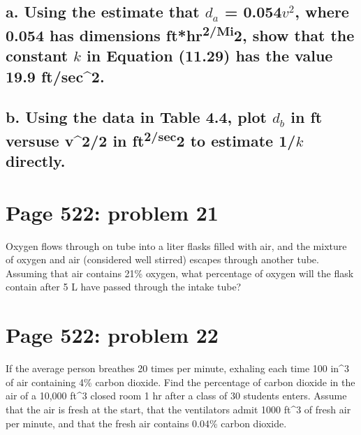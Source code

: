 \documentclass[]{article}
\begin{document}
\subsection{\texorpdfstring{a. Using the estimate that \(d_a\) =
0.054\(v^2\), where 0.054 has dimensions ft*hr\textsuperscript{2/Mi}2,
show that the constant \(k\) in Equation (11.29) has the value 19.9
ft/sec\^{}2.}{a. Using the estimate that d\_a = 0.054v\^{}2, where 0.054 has dimensions ft*hr2/Mi2, show that the constant k in Equation (11.29) has the value 19.9 ft/sec\^{}2.}}\label{a.-using-the-estimate-that-d_a-0.054v2-where-0.054-has-dimensions-fthr2mi2-show-that-the-constant-k-in-equation-11.29-has-the-value-19.9-ftsec2.}

\subsection{\texorpdfstring{b. Using the data in Table 4.4, plot \(d_b\)
in ft versuse v\^{}2/2 in ft\textsuperscript{2/sec}2 to estimate 1/\(k\)
directly.}{b. Using the data in Table 4.4, plot d\_b in ft versuse v\^{}2/2 in ft2/sec2 to estimate 1/k directly.}}\label{b.-using-the-data-in-table-4.4-plot-d_b-in-ft-versuse-v22-in-ft2sec2-to-estimate-1k-directly.}

\section{Page 522: problem 21}\label{page-522-problem-21}

Oxygen flows through on tube into a liter flasks filled with air, and
the mixture of oxygen and air (considered well stirred) escapes through
another tube. Assuming that air contains 21\% oxygen, what percentage of
oxygen will the flask contain after 5 L have passed through the intake
tube?

\section{Page 522: problem 22}\label{page-522-problem-22}

If the average person breathes 20 times per minute, exhaling each time
100 in\^{}3 of air containing 4\% carbon dioxide. Find the percentage of
carbon dioxide in the air of a 10,000 ft\^{}3 closed room 1 hr after a
class of 30 students enters. Assume that the air is fresh at the start,
that the ventilators admit 1000 ft\^{}3 of fresh air per minute, and
that the fresh air contains 0.04\% carbon dioxide.
\end{document}
